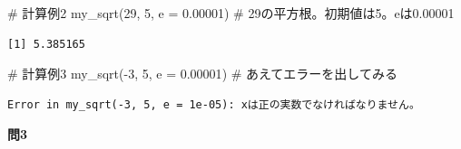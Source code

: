 \documentclass[
  a4paper,
  pandoc,
  ja=standard,
  jafont=haranoaji]{bxjsbook}
\newenvironment{Shaded}{\begin{snugshade}}{\end{snugshade}}
\newcommand{\AttributeTok}[1]{\textcolor[rgb]{0.00,0.48,0.65}{#1}}
\newcommand{\CommentTok}[1]{\textcolor[rgb]{0.37,0.37,0.37}{#1}}
\newcommand{\DecValTok}[1]{\textcolor[rgb]{0.68,0.00,0.00}{#1}}
\newcommand{\FloatTok}[1]{\textcolor[rgb]{0.68,0.00,0.00}{#1}}
\newcommand{\FunctionTok}[1]{\textcolor[rgb]{0.28,0.35,0.67}{#1}}
\newcommand{\NormalTok}[1]{\textcolor[rgb]{0.00,0.48,0.65}{#1}}
\newcommand{\SpecialCharTok}[1]{\textcolor[rgb]{0.37,0.37,0.37}{#1}}
\begin{document}
\begin{Shaded}
\begin{Highlighting}[numbers=left,,]
\CommentTok{\# 計算例2}
\FunctionTok{my\_sqrt}\NormalTok{(}\DecValTok{29}\NormalTok{, }\DecValTok{5}\NormalTok{, }\AttributeTok{e =} \FloatTok{0.00001}\NormalTok{) }\CommentTok{\# 29の平方根。初期値は5。eは0.00001}
\end{Highlighting}
\end{Shaded}

\begin{verbatim}
[1] 5.385165
\end{verbatim}

\begin{Shaded}
\begin{Highlighting}[numbers=left,,]
\CommentTok{\# 計算例3}
\FunctionTok{my\_sqrt}\NormalTok{(}\SpecialCharTok{{-}}\DecValTok{3}\NormalTok{, }\DecValTok{5}\NormalTok{, }\AttributeTok{e =} \FloatTok{0.00001}\NormalTok{) }\CommentTok{\# あえてエラーを出してみる}
\end{Highlighting}
\end{Shaded}

\begin{verbatim}
Error in my_sqrt(-3, 5, e = 1e-05): xは正の実数でなければなりません。
\end{verbatim}

\textbf{問3}
\end{document}
